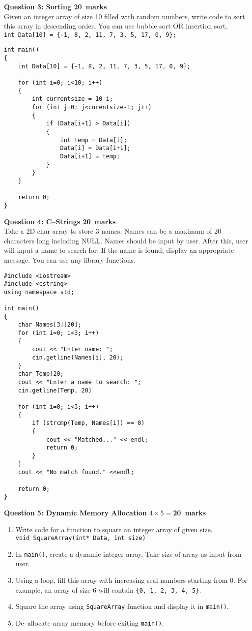 \documentclass[12pt,a4paper]{article}
\def\Qthree{20}
\def\Qfour{20}
\def\Qfive{20}
\begin{document}
\noindent\textbf{Question 3: Sorting \hfill \Qthree~marks}\\
Given an integer array of size 10 filled with random numbers, write code to sort this array in descending order. You can use bubble sort OR insertion sort.\\
\verb|int Data[10] = {-1, 8, 2, 11, 7, 3, 5, 17, 0, 9};|
\begin{lstlisting}[escapechar=!]
int main()
{
	int Data[10] = {-1, 8, 2, 11, 7, 3, 5, 17, 0, 9};

	for (int i=0; i<10; i++)
	{
		int currentsize = 10-i;
		for (int j=0; j<curentsize-1; j++)
		{
			if (Data[i+1] > Data[i])
			{
				int temp = Data[i];
				Data[i] = Data[i+1];
				Data[i+1] = temp;
			}
		}
	}

	return 0;
}
\end{lstlisting}
\newpage
\noindent\textbf{Question 4: C--Strings \hfill \Qfour~marks}\\
Take a 2D char array to store 3 names. Names can be a maximum of 20 characters long including NULL. Names should be input by user. After this, user will input a name to search for. If the name is found, display an appropriate message. You can use any library functions.
\begin{lstlisting}[escapechar=!]
#include <iostream>
#include <cstring>
using namespace std;

int main()
{
	char Names[3][20];
	for (int i=0; i<3; i++)
	{
		cout << "Enter name: ";
		cin.getline(Names[i], 20);
	}
	char Temp[20;
	cout << "Enter a name to search: ";
	cin.getline(Temp, 20)
	
	for (int i=0; i<3; i++)
	{
		if (strcmp(Temp, Names[i]) == 0)
		{
			cout << "Matched..." << endl;
			return 0;
		}
	}
	cout << "No match found." <<endl;
	
	return 0;
}
\end{lstlisting}
\newpage
\noindent\textbf{Question 5: Dynamic Memory Allocation \hfill $4\times 5=$\Qfive~marks}\\
\begin{enumerate}
\item Write code for a function to square an integer array of given size.\\
\verb|void SquareArray(int* Data, int size)|
\item In \verb|main()|, create a dynamic integer array. Take size of array as input from user.
\item Using a loop, fill this array with increasing real numbers starting from 0. For example, an array of size 6 will contain \verb|{0, 1, 2, 3, 4, 5}|.
\item Square the array using \verb|SquareArray| function and display it in \verb|main()|.
\item De--allocate array memory before exiting \verb|main()|.
\end{enumerate}
\end{document}
